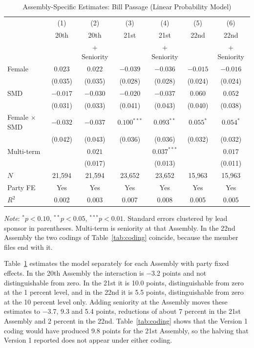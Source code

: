 \documentclass[11pt]{article}
\begin{document}
\begin{table}[htbp]
\centering
\caption{Assembly-Specific Estimates: Bill Passage (Linear Probability Model)}
\label{tab:assembly}
\footnotesize
\begin{tabular}{lcccccc}
\toprule
& (1) & (2) & (3) & (4) & (5) & (6) \\
& 20th & 20th & 21st & 21st & 22nd & 22nd \\
& & + Seniority & & + Seniority & & + Seniority \\
\midrule
Female               & $0.023$ & $0.022$ & $-0.039$ & $-0.036$ & $-0.015$ & $-0.016$ \\
                     & (0.035) & (0.035) & (0.028) & (0.028) & (0.024) & (0.024) \\[3pt]
SMD                  & $-0.017$ & $-0.030$ & $-0.020$ & $-0.037$ & $0.060$ & $0.052$ \\
                     & (0.031) & (0.033) & (0.041) & (0.043) & (0.040) & (0.038) \\[3pt]
Female $\times$ SMD  & $-0.032$ & $-0.037$ & $0.100^{***}$ & $0.093^{**}$ & $0.055^{*}$ & $0.054^{*}$ \\
                     & (0.042) & (0.043) & (0.036) & (0.036) & (0.032) & (0.032) \\[3pt]
Multi-term &  & $0.021$ &  & $0.037^{***}$ &  & $0.017$ \\
 &  & (0.017) &  & (0.013) &  & (0.011) \\
\midrule
$N$         & 21,594 & 21,594 & 23,652 & 23,652 & 15,963 & 15,963 \\
Party FE    & Yes & Yes & Yes & Yes & Yes & Yes \\
$R^2$       & 0.002 & 0.003 & 0.007 & 0.008 & 0.005 & 0.005 \\
\bottomrule
\end{tabular}

\vspace{4pt}
\parbox{0.9\textwidth}{\footnotesize \textit{Note}: $^*p<0.10$, $^{**}p<0.05$, $^{***}p<0.01$. Standard errors clustered by lead sponsor in parentheses. Multi-term is seniority at that Assembly. In the 22nd Assembly the two codings of Table~\ref{tab:coding} coincide, because the member files end with it.}
\end{table}

Table~\ref{tab:assembly} estimates the model separately for each Assembly with party fixed effects. In the 20th Assembly the interaction is $-$3.2 points and not distinguishable from zero. In the 21st it is 10.0 points, distinguishable from zero at the 1 percent level, and in the 22nd it is 5.5 points, distinguishable from zero at the 10 percent level only. Adding seniority at the Assembly moves these estimates to $-$3.7, 9.3 and 5.4 points, reductions of about 7 percent in the 21st Assembly and 2 percent in the 22nd. Table~\ref{tab:coding} shows that the Version 1 coding would have produced 9.8 points for the 21st Assembly, so the halving that Version 1 reported does not appear under either coding.
\end{document}
